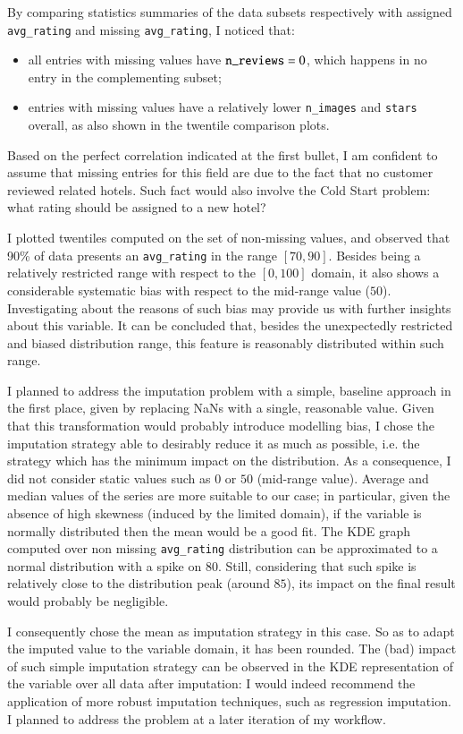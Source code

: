 \documentclass[preprint,12pt,3p]{elsarticle}
\begin{document}
By comparing statistics summaries of the data subsets respectively with assigned \verb|avg_rating| and missing \verb|avg_rating|, I noticed that:
\begin{itemize}
	\item all entries with missing values have $\verb|n_reviews|=0$, which happens in no entry in the complementing subset;
	\item entries with missing values have a relatively lower \verb|n_images| and \verb|stars| overall, as also shown in the twentile comparison plots.
\end{itemize}
Based on the perfect correlation indicated at the first bullet, I am confident to assume that missing entries for this field are due to the fact that no customer reviewed related hotels. Such fact would also involve the Cold Start problem: what rating should be assigned to a new hotel?

I plotted twentiles computed on the set of non-missing values, and observed that 90\% of data presents an \verb|avg_rating| in the range $[70,90]$. Besides being a relatively restricted range with respect to the $[0,100]$ domain, it also shows a considerable systematic bias with respect to the mid-range value ($50$). Investigating about the reasons of such bias may provide us with further insights about this variable.
It can be concluded that, besides the unexpectedly restricted and biased distribution range, this feature is reasonably distributed within such range.

I planned to address the imputation problem with a simple, baseline approach in the first place, given by replacing NaNs with a single, reasonable value. Given that this transformation would probably introduce modelling bias, I chose the imputation strategy able to desirably reduce it as much as possible, i.e. the strategy which has the minimum impact on the distribution. As a consequence, I did not consider static values such as $0$ or $50$ (mid-range value). Average and median values of the series are more suitable to our case; in particular, given the absence of high skewness (induced by the limited domain), if the variable is normally distributed then the mean would be a good fit.
The KDE graph computed over non missing \verb|avg_rating| distribution can be approximated to a normal distribution with a spike on $80$. Still, considering that such spike is relatively close to the distribution peak (around $85$), its impact on the final result would probably be negligible.

I consequently chose the mean as imputation strategy in this case. So as to adapt the imputed value to the variable domain, it has been rounded. The (bad) impact of such simple imputation strategy can be observed in the KDE representation of the variable over all data after imputation: I would indeed recommend the application of more robust imputation techniques, such as regression imputation. I planned to address the problem at a later iteration of my workflow. 
\end{document}
